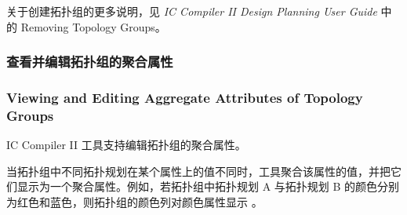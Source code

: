 \begin{seeAlsoBox}
关于创建拓扑组的更多说明，见 \emph{IC Compiler II Design Planning User Guide} 中的 Removing Topology Groups。
\end{seeAlsoBox}

\subsubsection{查看并编辑拓扑组的聚合属性}
\subsubsection*{Viewing and Editing Aggregate Attributes of Topology Groups}

IC Compiler II 工具支持编辑拓扑组的聚合属性。

当拓扑组中不同拓扑规划在某个属性上的值不同时，工具聚合该属性的值，并把它们显示为一个聚合属性。例如，若拓扑组中拓扑规划 A 与拓扑规划 B 的颜色分别为红色和蓝色，则拓扑组的颜色列对颜色属性显示 。

